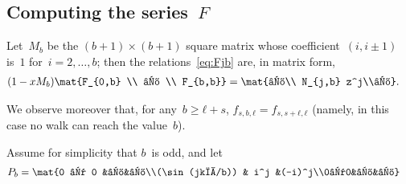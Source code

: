 \documentclass{article}
\begin{document}
\subsection{Computing the series~$F$}


Let~$M_{b}$ be the $(b+1)× (b+1)$ square matrix
whose coefficient~$(i, i±1)$ is~$1$ for~$i = 2, …, b$;
then the relations~\eqref{eq:Fjb} are, in matrix form,
\begin{align}\label{eq:matrix-F}
(1 - x M_b) \mat{F_{0,b} \\ ⋮ \\ F_{b,b}} &= \mat{⋮\\ N_{j,b} z^j\\⋮}.
\end{align}

We observe moreover that,
for any~$b ≥ ℓ + s$, $f_{s,b,ℓ} = f_{s,s+ℓ,ℓ}$
(namely, in this case no walk can reach the value~$b$).

Assume for simplicity that $b$~is odd, and let
\begin{align}
P_b &= \mat{0 ⋯ 0 &⋮&⋮\\(\sin(jkπ/b)) & i^j &(-i)^j\\0⋯0&⋮&⋮}
\end{align}
\end{document}
